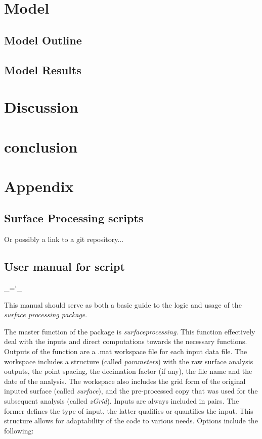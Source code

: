 \documentclass[12pt,a4paper]{article}
\begin{document}
\section{Model}
	\subsection{Model Outline}
	\subsection{Model Results}

\section{Discussion}

\section{conclusion}

\section{Appendix}

\subsection{Surface Processing scripts}

Or possibly a link to a git repository...

\subsection{User manual for script}

\chardef\_=`_

This manual should serve as both a basic guide to the logic and usage of the \textit{surface processing package}. 

The master function of the package is \textit{surfaceprocessing}. This function effectively deal with the inputs and direct computations towards the necessary functions. Outputs of the function are a .mat workspace file for each input data file. The workspace includes a structure (called \textit{parameters}) with the raw surface analysis outputs, the point spacing, the decimation factor (if any), the file name and the date of the analysis. The workspace also includes the grid form of the original inputed surface (called \textit{surface}), and the pre-processed copy that was used for the subsequent analysis (called \textit{zGrid}).  Inputs are always included in pairs. The former defines the type of input, the latter qualifies or quantifies the input. This structure allows for adaptability of the code to various needs. Options include the following:
\end{document}
